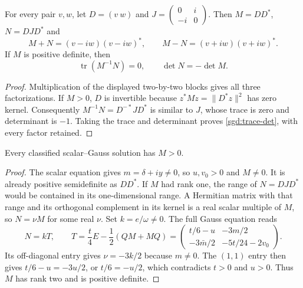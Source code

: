 \begin{lemma}\label{sgd:realization-necessity}
For every pair $v,w$, let $D=(v\ w)$ and
$J=\left(\begin{smallmatrix}0&i\\-i&0\end{smallmatrix}\right)$.
Then $M=DD^*$, $N=DJD^*$ and
\[
 M+N=(v-iw)(v-iw)^*,\qquad
 M-N=(v+iw)(v+iw)^*.
\]
If $M$ is positive definite, then
\begin{equation}
 \operatorname{tr}(M^{-1}N)=0,\qquad \det N=-\det M.
 \label{sgd:trace-det}
\end{equation}
\end{lemma}
\begin{proof}
Multiplication of the displayed two-by-two blocks gives all three
factorizations. If $M>0$, $D$ is invertible because
$z^*Mz=\|D^*z\|^2$ has zero kernel. Consequently
$M^{-1}N=D^{-*}JD^*$ is similar to $J$, whose trace is zero
and determinant is $-1$. Taking the trace and determinant proves
\eqref{sgd:trace-det}, with every factor retained.
\end{proof}

\begin{lemma}\label{sgd:rank-one-impossible}
Every classified scalar--Gauss solution has $M>0$.
\end{lemma}
\begin{proof}
The scalar equation gives $m=\delta+iy\ne0$, so $u,v_0>0$
and $M\ne0$. It is already positive semidefinite as $DD^*$.
If $M$ had rank one, the range of $N=DJD^*$ would be contained
in its one-dimensional range. A Hermitian matrix with that range
and its orthogonal complement in its kernel is a real scalar multiple
of $M$, so $N=\nu M$ for some real $\nu$.
Set $k=e/\omega\ne0$. The full Gauss equation reads
\begin{equation}
 N=kT,\qquad
 T=\frac t4 E-\frac12(QM+MQ)
  =\begin{pmatrix}t/6-u&-3m/2\\-3\bar m/2&-5t/24-2v_0\end{pmatrix}.
 \label{sgd:T}
\end{equation}
Its off-diagonal entry gives $\nu=-3k/2$ because $m\ne0$.
The $(1,1)$ entry then gives $t/6-u=-3u/2$, or $t/6=-u/2$,
which contradicts $t>0$ and $u>0$. Thus $M$ has rank two and is
positive definite.
\end{proof}

